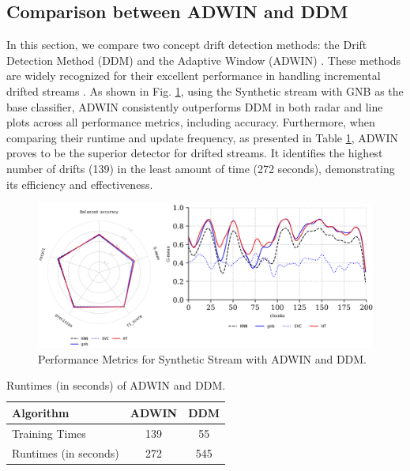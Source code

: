 \subsection{Comparison between ADWIN and DDM}
\label{sec:compared_drift_detector}
In this section, we compare two concept drift detection methods: the Drift Detection Method (DDM) \cite{gama2004learning} and the Adaptive Window (ADWIN) \cite{gama2004learning, adams2023explainable}. These methods are widely recognized for their excellent performance in handling incremental drifted streams \cite{gama2004learning, adams2023explainable, madkour2023historical, baena2006early}. As shown in Fig. \ref{fig:res5}, using the Synthetic stream with GNB as the base classifier, ADWIN consistently outperforms DDM in both radar and line plots across all performance metrics, including accuracy. Furthermore, when comparing their runtime and update frequency, as presented in Table \ref{table:table_4}, ADWIN proves to be the superior detector for drifted streams. It identifies the highest number of drifts (139) in the least amount of time (272 seconds), demonstrating its efficiency and effectiveness.
\begin{figure}[!ht]
	\centering
	\includegraphics[width=1\linewidth]{5_Emerging/images/res4.png}
	\caption{Performance Metrics for Synthetic Stream with ADWIN and DDM.}

	\label{fig:res5}
\end{figure}
	
\begin{table}[!ht]
	\centering
	\caption{Runtimes (in seconds) of ADWIN and DDM.}
	\begin{tabular}{|l|c|c|}
		\hline
	\textbf{Algorithm}     & \textbf{ADWIN} & \textbf{DDM}  \\ \hline
Training Times         & 139          & 55                   \\ \hline
Runtimes (in seconds)         & 272          & 545                   \\ \hline
	
	\end{tabular}
	\label{table:table_4}
	\end{table}